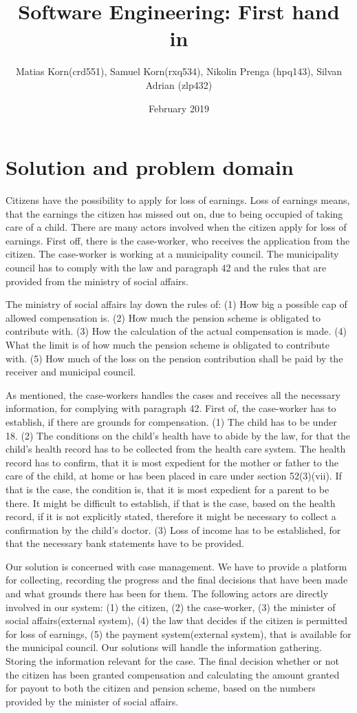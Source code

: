 \documentclass{article}
\title{Software Engineering: First hand in}
\subtitle{}
\author{Matias Korn(crd551), Samuel Korn(rxq534), Nikolin Prenga (hpq143), Silvan Adrian (zlp432)}
\date{February 2019}
\begin{document}
\maketitle

\section{Solution and problem domain}
Citizens have the possibility to apply for loss of earnings. Loss of earnings means, that the earnings the citizen has missed out on, due to being occupied of taking care of a child. There are many actors involved when the citizen apply for loss of earnings. First off, there is the case-worker, who receives the application from the citizen. The case-worker is working at a municipality council. The municipality council has to comply with the law and paragraph 42 and the rules that are provided from the ministry of social affairs.

The ministry of social affairs lay down the rules of:
(1) How big a possible cap of allowed compensation is.
(2) How much the pension scheme is obligated to contribute with. (3) How the calculation of the actual compensation is made. (4) What the limit is of how much the pension scheme is obligated to contribute with. (5) How much of the loss on the pension contribution shall be paid by the receiver and municipal council.

As mentioned, the case-workers handles the cases and receives all the necessary information, for complying with paragraph 42. First of, the case-worker has to establish, if there are grounds for compensation. (1) The child has to be under 18. (2) The conditions on the child's health have to abide by the law, for that the child's health record has to be collected from the health care system. The health record has to confirm, that it is most expedient for the mother or father to the care of the child, at home or has been placed in care under section 52(3)(vii). If that is the case, the condition is, that it is most expedient for a parent to be there. It might be difficult to establish, if that is the case, based on the health record, if it is not explicitly stated, therefore it might be necessary to collect a confirmation by the child's doctor. (3) Loss of income has to be established, for that the necessary bank statements have to be provided.

Our solution is concerned with case management. We have to provide a platform for collecting, recording the progress and the final decisions that have been made and what grounds there has been for them. The following actors are directly involved in our system: (1) the citizen, (2) the case-worker, (3) the minister of social affairs(external system), (4) the law that decides if the citizen is permitted for loss of earnings, (5) the payment system(external system), that is available for the municipal council. Our solutions will handle the information gathering. Storing the information relevant for the case. The final decision whether or not the citizen has been granted compensation and calculating the amount granted for payout to both the citizen and pension scheme, based on the numbers provided by the minister of social affairs.
\end{document}
